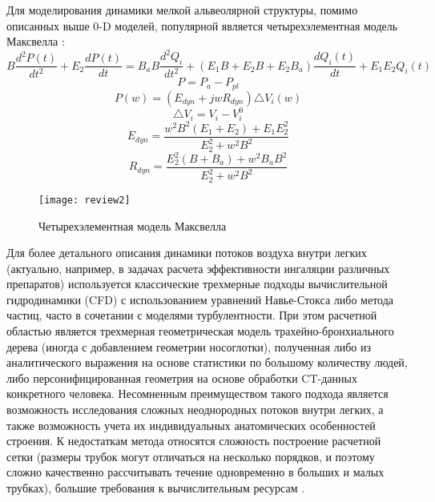 Для моделирования динамики мелкой альвеолярной структуры, помимо описанных выше 0-D моделей, популярной является четырехэлементная модель Максвелла \cite{Bates2009,Denny2000}:
\begin{equation}
B\frac{d^{2}P(t)}{dt^{2}}+E_{2}\frac{dP(t)}{dt}=B_{a}B\frac{d^{2}Q_{i}}{dt^{2}}+\left(E_{1}B+E_{2}B+E_{2}B_{a}\right)\frac{dQ_{i}(t)}{dt}+E_{1}E_{2}Q_{i}(t)
\end{equation}
\begin{equation}
P=P_{a}-P_{pl}
\end{equation}
\begin{equation}
P(w)=\left(E_{dyn}+jwR_{dyn}\right)\triangle V_{i}(w)
\end{equation}
\begin{equation}
\triangle V_{i}=V_{i}-V_{i}^{0}
\end{equation}
\begin{equation}
E_{dyn}=\frac{w^{2}B^{2}(E_{1}+E_{2})+E_{1}E_{2}^{2}}{E_{2}^{2}+w^{2}B^{2}}
\end{equation}
\begin{equation}
R_{dyn}=\frac{E^{2}_{2}(B+B_{a})+w^{2}B_{a}B^{2}}{E_{2}^{2}+w^{2}B^{2}}
\end{equation}
\begin{figure}[!ht]
	\centering
	\texttt{[image: review2]}
	\caption{Четырехэлементная модель Максвелла } 
\end{figure}
Для более детального описания динамики потоков воздуха внутри легких (актуально, например, в задачах расчета эффективности ингаляции различных препаратов) используется классические трехмерные подходы вычислительной гидродинамики (CFD) с использованием уравнений Навье-Стокса либо метода частиц, часто в сочетании с моделями турбулентности. При этом расчетной областью является трехмерная геометрическая модель трахейно-бронхиального дерева (иногда с добавлением геометрии носоглотки), полученная либо из аналитического выражения на основе статистики по большому количеству людей, либо персонифицированная геометрия на основе обработки CT-данных конкретного человека. Несомненным преимуществом такого подхода является возможность исследования сложных неоднородных потоков внутри легких, а также возможность учета их индивидуальных анатомических особенностей строения. К недостаткам метода относятся сложность построение расчетной сетки (размеры трубок могут отличаться на несколько порядков, и поэтому сложно качественно рассчитывать течение одновременно в больших и малых трубках), большие требования к вычислительным ресурсам \cite{Zhang2002,Liu2002,Green2004,Zhang2004,Lin2007,LDe2008,Wall2008}. 
